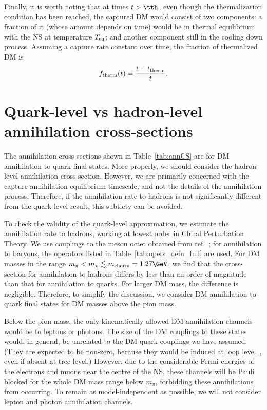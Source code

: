 Finally, it is worth noting that at times  $t>\tth$, even though the thermalization condition has been reached, the captured DM would consist of two components: a fraction of it (whose amount depends on time) would be in thermal equilibrium with the NS at temperature $T_{\rm eq}$; and another component still in the cooling down process. Assuming a  capture rate constant over time, the fraction of thermalized DM is 
\begin{equation}
    f_{\rm therm}(t) = \frac{t-t_{\rm therm}}{t}.
\end{equation}



\section{Quark-level vs hadron-level annihilation cross-sections}
\label{sec:quarkhadron}

The annihilation cross-sections shown in Table~\ref{tab:annCS} are for DM annihilation to quark final states.  More properly, we should consider the hadron-level annihilation cross-section.
However, we are primarily concerned with the capture-annihilation equilibrium timescale, and not the details of the annihilation process. Therefore, if the annihilation rate to hadrons is not significantly different from the quark level result, this subtlety can be avoided. 

To check the validity of the quark-level approximation, we estimate the annihilation rate to hadrons, working at lowest order in Chiral Perturbation Theory. We use couplings to the meson octet obtained from  ref.~\cite{Kumar:2018heq_dec_IndirectDetectionSubGeV}; for annihilation to baryons, the operators listed in Table~\ref{tab:opers_defn_full} are used. 
For DM masses in the range $m_\pi < m_\chi \lesssim m_{\rm charm} = 1.27\GeV$, we find that the cross-section for annihilation to hadrons differs by less than an order of magnitude than that for annihilation to quarks. For larger DM mass, the difference is negligible. Therefore, to simplify the discussion, we consider DM annihilation to quark final states for DM masses above the pion mass.


Below the pion mass, the only kinematically allowed DM annihilation channels would be to leptons or photons. The size of the DM couplings to these states would, in general, be unrelated to the DM-quark couplings we have assumed. (They are expected to be non-zero, because they would be induced at loop level~\cite{Bell:2019pyc_jun_CaptureLeptophilicDark}, even if absent at tree level.)
However, due to the considerable Fermi energies of the electrons and muons near the centre of the NS, these channels will be Pauli blocked for the whole DM mass range below $m_\pi$, forbidding these annihilations from occurring. To remain as model-independent as possible, we will not consider lepton and photon annihilation channels.

